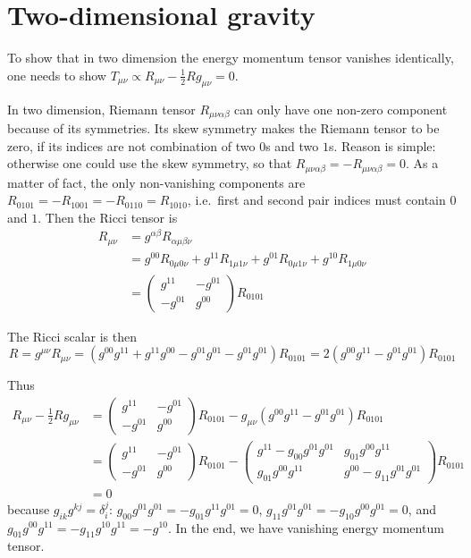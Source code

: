 \section{Two-dimensional gravity}
To show that in two dimension the energy momentum tensor vanishes identically, one needs to show $T_{\mu\nu} \propto R_{\mu\nu} - \frac{1}{2} R g_{\mu\nu} = 0$.

In two dimension, Riemann tensor $R_{\mu\nu\alpha\beta}$ can only have one non-zero component because of its symmetries. Its skew symmetry makes the Riemann tensor to be zero, if its indices are not combination of two $0$s and two $1$s. Reason is simple: otherwise one could use the skew symmetry, so that $R_{\mu\nu\alpha \beta} = -R_{\mu\nu\alpha\beta} = 0$. As a matter of fact, the only non-vanishing components are $R_{0101} = -R_{1001} = -R_{0110} = R_{1010}$, i.e.~first and second pair indices must contain $0$ and $1$. Then the Ricci tensor is
\begin{align*}
	R_{\mu\nu} &= g^{\alpha \beta }R_{\alpha\mu\beta\nu}  \\
				  &= g^{00} R_{0\mu0\nu} + g^{11} R_{1\mu1\nu} + g^{01} R_{0\mu1\nu} + g^{10} R_{1\mu0\nu}\\
				  &= \begin{pmatrix} g^{11} & -g^{01} \\ -g^{01} & g^{00} \end{pmatrix} R_{0101}
\end{align*}

The Ricci scalar is then
\begin{equation*}
	R = g^{\mu\nu} R_{\mu\nu} = (g^{00} g^{11} + g^{11} g^{00} - g^{01} g^{01} - g^{01}g^{01}) R_{0101} = 2 (g^{00}g^{11} - g^{01}g^{01}) R_{0101}
\end{equation*}

Thus
\begin{align*}
	R_{\mu \nu} - \frac{1}{2} R g_{\mu\nu} &= \begin{pmatrix} g^{11} & -g^{01} \\ -g^{01} & g^{00} \end{pmatrix} R_{0101} - g_{\mu\nu} (g^{00} g^{11} - g^{01} g^{01}) R_{0101} \\
														&= \begin{pmatrix} g^{11} & -g^{01} \\ -g^{01} & g^{00} \end{pmatrix} R_{0101} - \begin{pmatrix} g^{11} - g_{00} g^{01} g^{01} & g_{01} g^{00} g^{11}  \\ g_{01} g^{00} g^{11} & g^{00} - g_{11}g^{01}g^{01} \end{pmatrix} R_{0101}\\
														&= 0
\end{align*}
because $g_{ik}g^{kj} = \delta_i^{j}$: $g_{00} g^{01} g^{01} = -g_{01}g^{11} g^{01} = 0$, $g_{11} g^{01} g^{01} = - g_{10} g^{00} g^{01} = 0$, and $g_{01} g^{00} g^{11} = -g_{11}g^{10} g^{11} = -g^{10}$. In the end, we have vanishing energy momentum tensor.

